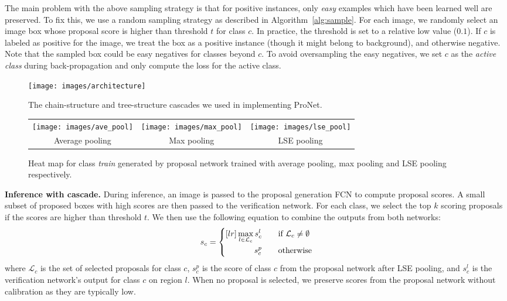 \documentclass[10pt,twocolumn,letterpaper]{article}
\begin{document}
The main problem with the above sampling strategy is that for positive instances, only \textit{easy} examples which have been learned well are preserved. To fix this, we use a random sampling strategy as described in Algorithm~\ref{alg:sample}. For each image, we randomly select an image box whose proposal score is higher than threshold $t$ for class $c$. In practice, the threshold is set to a relative low value (\eg $0.1$). If $c$ is labeled as positive for the image, we treat the box as a positive instance (though it might belong to background), and otherwise negative. Note that the sampled box could be easy negatives for classes beyond $c$. To avoid oversampling the easy negatives, we set $c$ as the \textit{active class} during back-propagation and only compute the loss for the active class.

\begin{figure}
  \centering
    \texttt{[image: images/architecture]}
  \caption{The chain-structure and tree-structure cascades we used in implementing ProNet.}
  \label{fig:chain_tree}
\end{figure}



\begin{figure*}
\centering
\begin{tabular}{ccc}
\texttt{[image: images/ave\_pool]}&\texttt{[image: images/max\_pool]}&\texttt{[image: images/lse\_pool]}\\
Average pooling & Max pooling & LSE pooling
\end{tabular}  
\caption{Heat map for class \textit{train} generated by proposal network trained with average pooling, max pooling and LSE pooling respectively.}
\label{fig:pool_compare}
\end{figure*}

\textbf{Inference with cascade.} During inference, an image is passed to the proposal generation FCN to compute proposal scores. A small subset of proposed boxes with high scores are then passed to the verification network. For each class, we select the top $k$ scoring proposals if the scores are higher than threshold $t$. We then use the following equation to combine the outputs from both networks:
\begin{equation}
s_c = \left\{
\begin{aligned}[lr]
\max_{l\in\mathcal{L}_c} s^{l}_c&\textrm{\qquad if $\mathcal{L}_c \neq \emptyset$}\\
s^{p}_c&\textrm{\qquad otherwise}
\end{aligned}
\right.
\end{equation}
where $\mathcal{L}_c$ is the set of selected proposals for class $c$, $s^p_c$ is the score of class $c$ from the proposal network after LSE pooling, and $s^l_c$ is the verification network's output for class $c$ on region $l$. When no proposal is selected, we preserve scores from the proposal network without calibration as they are typically low.
\end{document}
